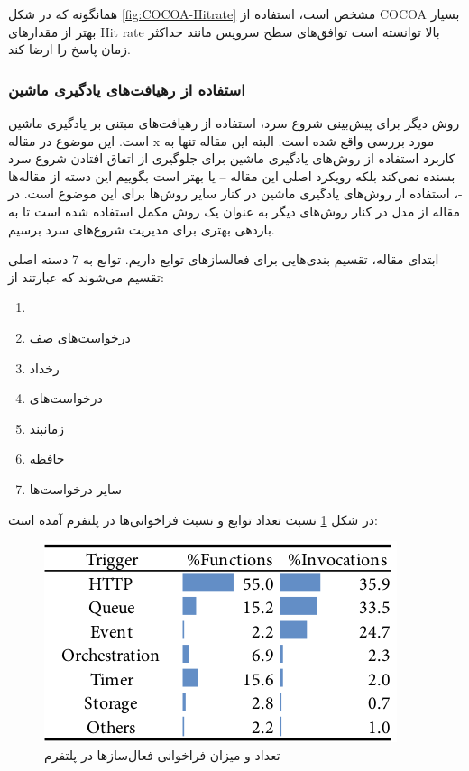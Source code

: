 همانگونه که در شکل \ref{fig:COCOA-Hitrate} مشخص است، استفاده از COCOA بسیار بهتر از مقدار‌های Hit rate بالا توانسته است توافق‌های سطح سرویس مانند حداکثر زمان پاسخ را ارضا کند. 

\subsubsection{استفاده از رهیافت‌های یادگیری ماشین}

روش دیگر برای پیش‌بینی شروع سرد، استفاده‌ از رهیافت‌های مبتنی بر یادگیری ماشین است. این موضوع در مقاله x مورد بررسی واقع شده است. البته این مقاله تنها به کاربرد استفاده از روش‌های یادگیری ماشین برای جلوگیری از اتفاق افتادن شروع سرد بسنده نمی‌کند بلکه رویکرد اصلی این مقاله – یا بهتر است بگوییم این دسته از مقاله‌ها -، استفاده از روش‌های یادگیری ماشین در کنار سایر روش‌ها برای این موضوع است. در مقاله \cite{shahrad2020serverless} از مدل  در کنار روش‌های دیگر به عنوان یک روش مکمل استفاده شده است تا به بازدهی بهتری برای مدیریت شروع‌های سرد برسیم. 

ابتدای مقاله‌، تقسیم بندی‌هایی برای فعالساز‌های توابع داریم. توابع به 7 دسته اصلی تقسیم می‌شوند که عبارتند از: 

\begin{enumerate}
	\item {}
	\item درخواست‌های صف
	\item رخداد
	\item درخواست‌های 
	\item زمانبند
	\item حافظه
	\item سایر درخواست‌ها
\end{enumerate}

در شکل \ref{fig:Azure-Trigger-invocations} نسبت تعداد توابع و نسبت فراخوانی‌ها در پلتفرم  آمده است:‌

\begin{figure}
	\centering
	\includegraphics[width=0.8\linewidth]{figs/Azure-Trigger-invocations}
	\caption {تعداد و میزان فراخوانی فعال‌سازها در پلتفرم }
	\label{fig:Azure-Trigger-invocations}
\end{figure}

